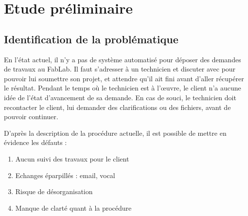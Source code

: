 \documentclass[
    iai, %
    eai, %
]{heig-tb}
\begin{document}
\maketitle
\frontmatter
\clearemptydoublepage

\preamble
\authentification

\begin{abstract}
  
\end{abstract}

\clearemptydoublepage
{
  \tableofcontents
  \let\cleardoublepage\clearpage
  \listoffigures
  \let\cleardoublepage\clearpage
  \listoftables
  \let\cleardoublepage\clearpage
  \listoflistings
}

\printnomenclature
\clearemptydoublepage
{}


\mainmatter
\chapter{Etude préliminaire}

\section{Identification de la problématique}
En l'état actuel, il n'y a pas de système automatisé pour déposer des demandes de travaux au FabLab. Il faut s'adresser à un technicien et discuter avec pour pouvoir lui soumettre son projet, et attendre qu'il ait fini avant d'aller récupérer le résultat. Pendant le temps où le technicien est à l'œuvre, le client n'a aucune idée de l'état d'avancement de sa demande. En cas de souci, le technicien doit recontacter le client, lui demander des clarifications ou des fichiers, avant de pouvoir continuer. 

D'après la description de la procédure actuelle, il est possible de mettre en évidence les défauts :

\begin{enumerate}
  \item Aucun suivi des travaux pour le client
  \item Echanges éparpillés : email, vocal
  \item Risque de désorganisation
  \item Manque de clarté quant à la procédure
\end{enumerate}
\end{document}
